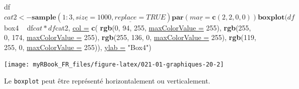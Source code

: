 \documentclass[twoside,symmetric]{book}
\newenvironment{Shaded}{}{}
\newcommand{\DataTypeTok}[1]{\underline{#1}}
\newcommand{\DecValTok}[1]{#1}
\newcommand{\KeywordTok}[1]{\textbf{#1}}
\newcommand{\NormalTok}[1]{#1}
\newcommand{\OperatorTok}[1]{#1}
\newcommand{\OtherTok}[1]{#1}
\newcommand{\StringTok}[1]{#1}
\begin{document}
\begin{Shaded}
\begin{Highlighting}[]
\NormalTok{df}\OperatorTok{$}\NormalTok{cat2 <-}\StringTok{ }\KeywordTok{sample}\NormalTok{(}\DecValTok{1}\OperatorTok{:}\DecValTok{3}\NormalTok{, }\DataTypeTok{size =} \DecValTok{1000}\NormalTok{, }\DataTypeTok{replace =} \OtherTok{TRUE}\NormalTok{)}
\KeywordTok{par}\NormalTok{(}\DataTypeTok{mar =} \KeywordTok{c}\NormalTok{(}\DecValTok{2}\NormalTok{, }\DecValTok{2}\NormalTok{, }\DecValTok{0}\NormalTok{, }\DecValTok{0}\NormalTok{)) }
\KeywordTok{boxplot}\NormalTok{(df}\OperatorTok{$}\NormalTok{box4 }\OperatorTok{~}\StringTok{ }\NormalTok{df}\OperatorTok{$}\NormalTok{cat}\OperatorTok{*}\NormalTok{df}\OperatorTok{$}\NormalTok{cat2, }\DataTypeTok{col =} \KeywordTok{c}\NormalTok{(}
  \KeywordTok{rgb}\NormalTok{(}\DecValTok{0}\NormalTok{, }\DecValTok{94}\NormalTok{, }\DecValTok{255}\NormalTok{, }\DataTypeTok{maxColorValue =} \DecValTok{255}\NormalTok{),  }
  \KeywordTok{rgb}\NormalTok{(}\DecValTok{255}\NormalTok{, }\DecValTok{0}\NormalTok{, }\DecValTok{174}\NormalTok{, }\DataTypeTok{maxColorValue =} \DecValTok{255}\NormalTok{),  }
  \KeywordTok{rgb}\NormalTok{(}\DecValTok{255}\NormalTok{, }\DecValTok{136}\NormalTok{, }\DecValTok{0}\NormalTok{, }\DataTypeTok{maxColorValue =} \DecValTok{255}\NormalTok{),  }
  \KeywordTok{rgb}\NormalTok{(}\DecValTok{119}\NormalTok{, }\DecValTok{255}\NormalTok{, }\DecValTok{0}\NormalTok{, }\DataTypeTok{maxColorValue =} \DecValTok{255}\NormalTok{)), }\DataTypeTok{ylab =} \StringTok{"Box4"}\NormalTok{)}
\end{Highlighting}
\end{Shaded}

\texttt{[image: myRBook\_FR\_files/figure-latex/021-01-graphiques-20-2]}

Le \texttt{boxplot} peut être représenté horizontalement ou verticalement.
\end{document}
